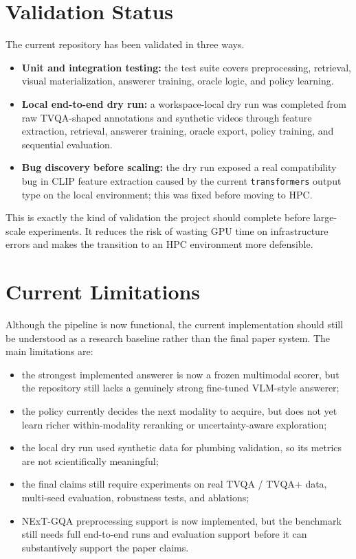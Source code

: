 \documentclass{article}
\begin{document}
\section{Validation Status}
The current repository has been validated in three ways.
\begin{itemize}
  \item \textbf{Unit and integration testing:} the test suite covers preprocessing, retrieval, visual materialization, answerer training, oracle logic, and policy learning.
  \item \textbf{Local end-to-end dry run:} a workspace-local dry run was completed from raw TVQA-shaped annotations and synthetic videos through feature extraction, retrieval, answerer training, oracle export, policy training, and sequential evaluation.
  \item \textbf{Bug discovery before scaling:} the dry run exposed a real compatibility bug in CLIP feature extraction caused by the current \texttt{transformers} output type on the local environment; this was fixed before moving to HPC.
\end{itemize}

This is exactly the kind of validation the project should complete before large-scale experiments.
It reduces the risk of wasting GPU time on infrastructure errors and makes the transition to an HPC environment more defensible.

\section{Current Limitations}
Although the pipeline is now functional, the current implementation should still be understood as a research baseline rather than the final paper system.
The main limitations are:
\begin{itemize}
  \item the strongest implemented answerer is now a frozen multimodal scorer, but the repository still lacks a genuinely strong fine-tuned VLM-style answerer;
  \item the policy currently decides the next modality to acquire, but does not yet learn richer within-modality reranking or uncertainty-aware exploration;
  \item the local dry run used synthetic data for plumbing validation, so its metrics are not scientifically meaningful;
  \item the final claims still require experiments on real TVQA / TVQA+ data, multi-seed evaluation, robustness tests, and ablations;
  \item NExT-GQA preprocessing support is now implemented, but the benchmark still needs full end-to-end runs and evaluation support before it can substantively support the paper claims.
\end{itemize}
\end{document}
